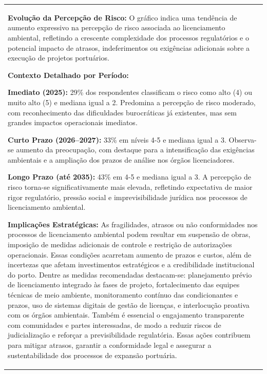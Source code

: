 \documentclass[
  portuguese,
  letterpaper,
  DIV=11,
  numbers=noendperiod]{scrreprt}
\begin{document}
\begin{tcolorbox}[enhanced jigsaw, breakable, leftrule=.75mm, opacitybacktitle=0.6, coltitle=black, rightrule=.15mm, colbacktitle=quarto-callout-tip-color!10!white, colframe=quarto-callout-tip-color-frame, titlerule=0mm, bottomtitle=1mm, colback=white, toprule=.15mm, toptitle=1mm, left=2mm, title=\textcolor{quarto-callout-tip-color}{\faLightbulb}\hspace{0.5em}{Destaques}, opacityback=0, bottomrule=.15mm, arc=.35mm]

\begin{longtable}[]{@{}
  >{\raggedright\arraybackslash}p{}@{}}
\toprule\noalign{}
\endhead
\bottomrule\noalign{}
\endlastfoot
\textbf{Evolução da Percepção de Risco:} O gráfico indica uma tendência
de aumento expressivo na percepção de risco associada ao licenciamento
ambiental, refletindo a crescente complexidade dos processos
regulatórios e o potencial impacto de atrasos, indeferimentos ou
exigências adicionais sobre a execução de projetos portuários.

\textbf{Contexto Detalhado por Período:}

\textbf{Imediato (2025):} 29\% dos respondentes classificam o risco como
alto (4) ou muito alto (5) e mediana igual a 2. Predomina a percepção de
risco moderado, com reconhecimento das dificuldades burocráticas já
existentes, mas sem grandes impactos operacionais imediatos. \textbar{}

\textbf{Curto Prazo (2026--2027):} 33\% em níveis 4-5 e mediana igual a
3. Observa-se aumento da preocupação, com destaque para a intensificação
das exigências ambientais e a ampliação dos prazos de análise nos órgãos
licenciadores. \textbar{}

\textbf{Longo Prazo (até 2035):} 43\% em 4-5 e mediana igual a 3. A
percepção de risco torna-se significativamente mais elevada, refletindo
expectativa de maior rigor regulatório, pressão social e
imprevisibilidade jurídica nos processos de licenciamento ambiental.
\textbar{}

\textbf{Implicações Estratégicas:} As fragilidades, atrasos ou não
conformidades nos processos de licenciamento ambiental podem resultar em
suspensão de obras, imposição de medidas adicionais de controle e
restrição de autorizações operacionais. Essas condições acarretam
aumento de prazos e custos, além de incertezas que afetam investimentos
estratégicos e a credibilidade institucional do porto. Dentre as medidas
recomendadas destacam-se: planejamento prévio de licenciamento integrado
às fases de projeto, fortalecimento das equipes técnicas de meio
ambiente, monitoramento contínuo das condicionantes e prazos, uso de
sistemas digitais de gestão de licenças, e interlocução proativa com os
órgãos ambientais. Também é essencial o engajamento transparente com
comunidades e partes interessadas, de modo a reduzir riscos de
judicialização e reforçar a previsibilidade regulatória. Essas ações
contribuem para mitigar atrasos, garantir a conformidade legal e
assegurar a sustentabilidade dos processos de expansão portuária. \\
\end{longtable}

\end{tcolorbox}
\end{document}
